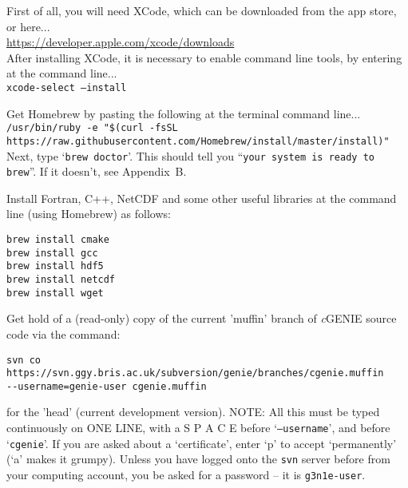 \documentclass[10pt,twoside]{article}
\begin{document}
\begin{compactenum}

\item First of all, you will need XCode, which can be downloaded from the app store, or here... 
\\\href{https://developer.apple.com/xcode/downloads}{https://developer.apple.com/xcode/downloads} \\After installing XCode, it is necessary to enable command line tools, by entering at the command line...\\
\texttt{xcode-select --install} 

\item Get Homebrew by pasting the following at the terminal command line...
\\ \texttt{/usr/bin/ruby -e "\$(curl -fsSL https://raw.githubusercontent.com/Homebrew/install/master/install)"}
\\ Next, type `\texttt{brew doctor}'. This should tell you ``\texttt{your system is ready to brew}''. If it doesn't, see Appendix~B. 

\item Install Fortran, C++, NetCDF and some other useful libraries at the command line (using Homebrew) as follows:

\vspace{-5pt}\begin{verbatim}
brew install cmake
brew install gcc
brew install hdf5
brew install netcdf
brew install wget
\end{verbatim}

\item Get hold of a (read-only) copy of the current 'muffin' branch of \textit{c}GENIE source code via the command:
\vspace{-5pt}\begin{verbatim}
svn co https://svn.ggy.bris.ac.uk/subversion/genie/branches/cgenie.muffin
--username=genie-user cgenie.muffin
\end{verbatim}\vspace{-5pt}
for the 'head' (current development version).
NOTE: All this must be typed continuously on ONE LINE, with a S P A C E before `\texttt{--username}', and before `\texttt{cgenie}'.
If you are asked about a `certificate', enter `p' to accept `permanently' (`a' makes it grumpy). Unless you have logged onto the \texttt{svn} server before from your computing account, you be asked for a password -- it is \texttt{g3n1e-user}.



\end{compactenum}
\end{document}
